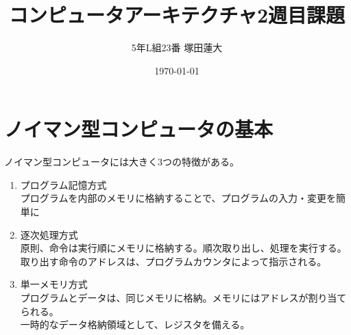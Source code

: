 \documentclass[a4j,uplatex]{jsarticle}
\title{コンピュータアーキテクチャ2週目課題}
\author{5年L組23番 塚田蓮大}
\date{\today}
\numberwithin{equation}{section}
\begin{document}
	\maketitle

	\section{ノイマン型コンピュータの基本}
		ノイマン型コンピュータには大きく3つの特徴がある。
		\begin{enumerate}
			\item プログラム記憶方式 \mbox{}\\
				プログラムを内部のメモリに格納することで、プログラムの入力・変更を簡単に
			\item 逐次処理方式  \mbox{}\\
				原則、命令は実行順にメモリに格納する。順次取り出し、処理を実行する。\\
				取り出す命令のアドレスは、プログラムカウンタによって指示される。
			\item 単一メモリ方式 \mbox{}\\
				プログラムとデータは、同じメモリに格納。メモリにはアドレスが割り当てられる。 \\
				一時的なデータ格納領域として、レジスタを備える。
		\end{enumerate}
\end{document}
